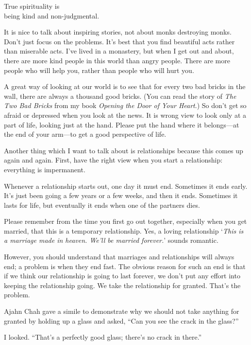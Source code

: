 \documentclass[12pt, openany]{book}
\newenvironment{aphorism}%
{%
\begin{center}\begin{itshape}
}%
{\end{itshape}\end{center}
}%
\begin{document}
\begin{aphorism}
True spirituality is\\  
being kind and non-judgmental.
\end{aphorism}

It is nice to talk about inspiring stories, not about monks destroying monks. Don’t just focus on the problems. It’s best that you find beautiful acts rather than miserable acts. I’ve lived in a monastery, but when I get out and about, there are more kind people in this world than angry people. There are more people who will help you, rather than people who will hurt you. 

A great way of looking at our world is to see that for every two bad bricks in the wall, there are always a thousand good bricks. (You can read the story of \emph{The Two Bad Bricks} from my book \emph{Opening the Door of Your Heart}.) So don’t get so afraid or depressed when you look at the news. It is wrong view to look only at a part of life, looking just at the hand. Please put the hand where it belongs—at the end of your arm—to get a good perspective of life. 

Another thing which I want to talk about is relationships because this comes up again and again. First, have the right view when you start a relationship: everything is impermanent. 

Whenever a relationship starts out, one day it must end. Sometimes it ends early. It’s just been going a few years or a few weeks, and then it ends. Sometimes it lasts for life, but eventually it ends when one of the partners dies. 

Please remember from the time you first go out together, especially when you get married, that this is a temporary relationship. Yes, a loving relationship ‘\emph{This is a marriage made in heaven. We’ll be married forever.}’ sounds romantic. 

However, you should understand that marriages and relationships will always end; a problem is when they end fast. The obvious reason for such an end is that if we think our relationship is going to last forever, we don’t put any effort into keeping the relationship going. We take the relationship for granted. That’s the problem. 

Ajahn Chah gave a simile to demonstrate why we should not take anything for granted by holding up a glass and asked, “Can you see the crack in the glass?” 

I looked. “That’s a perfectly good glass; there’s no crack in there.” 
\end{document}

